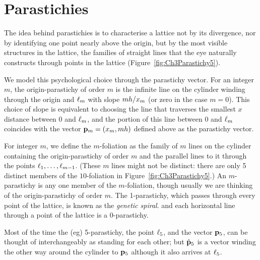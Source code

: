 \section{Parastichies}
\label{sec:parastichies}
The idea behind parastichies is to characterise a lattice not by its divergence, nor by identifying one point nearly above the origin, but by the most visible structures in the lattice, the families of straight lines that the eye naturally constructs through points in the lattice (Figure~\ref{fig:Ch3Parastichy5}).





We model this psychological choice through the parastichy vector. For an integer $m$, the origin-parastichy of order $m$ is the infinite line on the cylinder winding through the origin and $\ell_{{m}}$ with slope $mh/x_m$ (or zero in the case $m=0$). This choice of slope is equivalent to choosing the line that traverses the smallest $x$ distance between $0$ and $\ell_{{m}}$, and the portion of this line between $0$ and $\ell_{{m}}$ coincides with the vector ${\mathbf p}_{m}=(x_m,mh)$ defined above as the parastichy vector.

For integer $m$, we define the $m$-foliation as  the family of  $m$ lines on the cylinder containing the origin-parastichy of order $m$ and the parallel lines to it through the points $\ell_{{1}},\ldots,\ell_{{m-1}}$. (These $m$ lines might not be distinct: there are only 5 distinct members of the $10$-foliation in Figure~\ref{fig:Ch3Parastichy5}.)
An $m$-parastichy is any one member of the $m$-foliation, though usually we are thinking of the origin-parastichy of order $m$. 
The 1-parastichy, which passes through every point of the lattice, is known as the \emph{genetic spiral}. 
 and each horizontal line through a point of the lattice is a $0$-parastichy. 

Most of the time the (eg) 5-parastichy, the point $\ell_{{5}}$, and the vector ${\mathbf p}_{5}$,  can be thought of interchangeably as standing for each other; but $\hat{\mathbf p}_{5}$ is a  vector winding the other way around the cylinder to ${\mathbf p}_{5}$ although it also arrives at  $\ell_{{5}}$.
